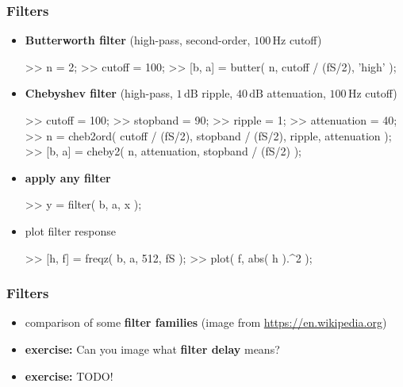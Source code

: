 \begin{frame}[fragile]
	\frametitle{Filters}
	\begin{itemize}
		\item \textbf{Butterworth filter} (high-pass, second-order, $100\,\textrm{Hz}$ cutoff)
			\begin{code}
>> n = 2; \color{medium}%
>> cutoff = 100; \color{medium}%
>> [b, a] = butter( n, cutoff / (fS/2), 'high' );
			\end{code}
		\item \textbf{Chebyshev filter} (high-pass, $1\,\textrm{dB}$ ripple, $40\,\textrm{dB}$ attenuation, $100\,\textrm{Hz}$ cutoff)
			\begin{code}
>> cutoff = 100; \color{medium}%
>> stopband = 90; \color{medium}%
>> ripple = 1; \color{medium}%
>> attenuation = 40; \color{medium}%
>> n = cheb2ord( cutoff / (fS/2), stopband / (fS/2), ripple, attenuation );
>> [b, a] = cheby2( n, attenuation, stopband / (fS/2) );
			\end{code}
		\item \textbf{apply any filter}
			\begin{code}
>> y = filter( b, a, x ); \color{medium}%
			\end{code}
		\item plot filter response
			\begin{code}
>> [h, f] = freqz( b, a, 512, fS ); \color{medium}%
>> plot( f, abs( h ).^2 );
			\end{code}
	\end{itemize}
\end{frame}

\begin{frame}
	\frametitle{Filters}
	\begin{itemize}
		\item comparison of some \textbf{filter families} (image from \url{https://en.wikipedia.org})
			\begin{figure}
				\centering
				\begin{subfigure}[c]{0.7\linewidth}
				\end{subfigure}
			\end{figure}
		\item \textbf{exercise:} Can you image what \textbf{filter delay} means?
		\item \textbf{exercise:} TODO!
	\end{itemize}
\end{frame}


